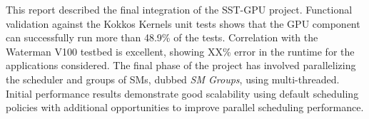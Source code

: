 This report described the final integration of the SST-GPU project.
Functional validation against the Kokkos Kernels unit tests shows that the GPU
component can successfully run more than 48.9\% of the tests. Correlation with the Waterman V100 testbed is
excellent, showing XX\% error in the runtime for the applications considered.
The final phase of the project has involved parallelizing the scheduler and
groups of SMs, dubbed {\em SM Groups}, using multi-threaded.
Initial performance results demonstrate good scalability
using default scheduling policies with additional opportunities to improve
parallel scheduling performance.
